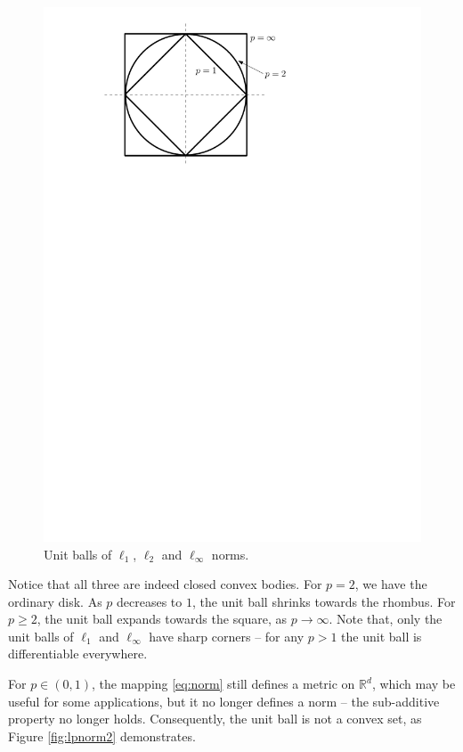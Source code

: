 \documentclass[10pt,a4paper,twoside]{book}
\newcommand{\rd}{\mathbb{R}^{d}}
\theoremstyle{definition}
\theoremstyle{remark}
\begin{document}
\begin{figure}[ht]
    \centering
    \includegraphics[scale=0.5]{figures/lpnorm1.pdf}
    \caption{Unit balls of $\ell_1$, $\ell_2$ and $\ell_{\infty}$ norms.}
    \label{fig:lpnorm1}
\end{figure}

Notice that all three are indeed closed convex bodies. For $p=2$, we have the ordinary disk. As $p$ decreases to $1$, the unit ball shrinks towards the rhombus. For $p \geq 2$, the unit ball expands towards the square, as $p \rightarrow \infty$. Note that, only the unit balls of $\ell_1$ and $\ell_{\infty}$ have sharp corners -- for any $p>1$ the unit ball is differentiable everywhere.

For $p \in (0,1)$, the mapping \eqref{eq:norm} still defines a metric on $\rd$, which may be useful for some applications, but it no longer defines a norm -- the sub-additive property no longer holds. Consequently, the unit ball is not a convex set, as Figure \ref{fig:lpnorm2} demonstrates.
\end{document}

